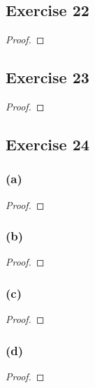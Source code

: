 \documentclass[14pt]{extarticle}
\begin{document}
\subsection{Exercise 22}

\begin{proof}

\end{proof}

\subsection{Exercise 23}

\begin{proof}

\end{proof}

\subsection{Exercise 24}

\subsubsection{(a)}

\begin{proof}

\end{proof}

\subsubsection{(b)}

\begin{proof}

\end{proof}

\subsubsection{(c)}

\begin{proof}

\end{proof}

\subsubsection{(d)}

\begin{proof}

\end{proof}
\end{document}
